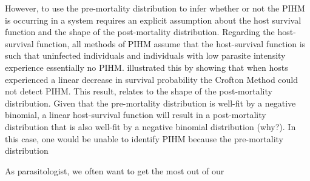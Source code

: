 \documentclass[12pt, a4paper]{article}
\begin{document}
However, to use the pre-mortality distribution to infer whether or not the PIHM
is occurring in a system requires an explicit assumption about the host
survival function and the shape of the post-mortality distribution.  Regarding
the host-survival function, all methods of PIHM assume that the host-survival
function is such that uninfected individuals and individuals with low parasite
intensity experience essentially no PIHM.  \cite{Lanciani1989} illustrated this
by showing that when hosts experienced a linear decrease in survival
probability the Crofton Method could not detect PIHM.  This result, relates to
the shape of the post-mortality distribution.  Given that the pre-mortality
distribution is well-fit by a negative binomial, a linear host-survival
function will result in a post-mortality distribution that is also well-fit by
a negative binomial distribution (why?).  In this case, one would be unable to
identify PIHM because the pre-mortality distribution



As parasitologist, we often want to get the most out of our





\singlespacing


\end{document}
